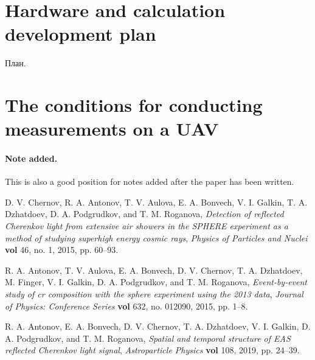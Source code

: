 \documentclass[a4paper,11pt]{article}
\begin{document}
\section{Hardware and calculation development plan}

План.

\section{The conditions for conducting measurements on a UAV}







\paragraph{Note added.} This is also a good position for notes added
after the paper has been written.



\begin{thebibliography}{99}

D. V. Chernov, R. A. Antonov, T. V. Aulova, E. A. Bonvech, V. I. Galkin, T. A. Dzhatdoev, D. A. Podgrudkov, and T. M. Roganova, \emph{Detection of reflected Cherenkov light from extensive air showers in the SPHERE experiment as a method of studying superhigh energy cosmic rays}, \emph{Physics of Particles and Nuclei} {\bf vol} 46, no. 1, 2015, pp. 60–93.

R. A. Antonov, T. V. Aulova, E. A. Bonvech, D. V. Chernov, T. A. Dzhatdoev, M. Finger, V. I. Galkin, D. A. Podgrudkov, and T. M. Roganova, \emph{Event-by-event study of cr composition with the sphere experiment using the 2013 data}, \emph{Journal of Physics: Conference Series} {\bf vol} 632, no. 012090, 2015, pp. 1–8.

R. A. Antonov, E. A. Bonvech, D. V. Chernov, T. A. Dzhatdoev, V. I. Galkin, D. A. Podgrudkov, and T. M. Roganova, \emph{Spatial and temporal structure of EAS reflected Cherenkov light signal}, \emph{Astroparticle Physics} {\bf vol} 108, 2019, pp. 24–39.





\end{thebibliography}
\end{document}
